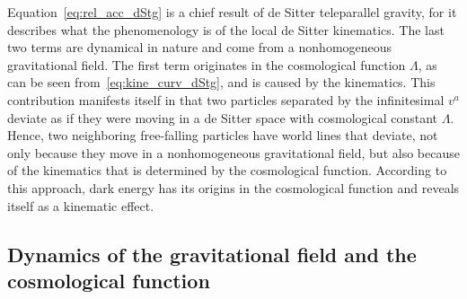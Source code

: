 \documentclass[%
5p,
times,
sort&compress
]{elsarticle}
\begin{document}
Equation~\eqref{eq:rel_acc_dStg} is a chief result of de Sitter 
teleparallel gravity, for it describes what the phenomenology is 
of the local de Sitter kinematics. The last two terms are 
dynamical in nature and come from a nonhomogeneous gravitational 
field. The first term originates in the cosmological function 
$\Lambda$, as can be seen from~\eqref{eq:kine_curv_dStg}, and is 
caused by the kinematics.  This contribution manifests itself in 
that two particles separated by the infinitesimal $v^a$ deviate 
as if they were moving in a de Sitter space with cosmological 
constant $\Lambda$. Hence, two neighboring free-falling particles 
have world lines that deviate, not only because they move in 
a nonhomogeneous gravitational field, but also because of the 
kinematics that is determined by the cosmological function.  
According to this approach, dark energy has its origins in the 
cosmological function and reveals itself as a kinematic effect.

\subsection{Dynamics of the gravitational field and the 
  cosmological function}
\label{ssec:dyn_grav_field}
\end{document}
